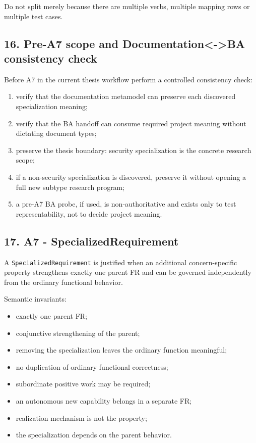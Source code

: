 \documentclass[11pt,a4paper]{article}
\providecommand{\tightlist}{\setlength{\itemsep}{0pt}\setlength{\parskip}{0pt}}
\begin{document}
Do not split merely because there are multiple verbs, multiple mapping
rows or multiple test cases.

\subsection{16. Pre-A7 scope and Documentation\textless-\textgreater BA
consistency
check}\label{16-pre-a7-scope-and-documentation-ba-consistency-check}

Before A7 in the current thesis workflow perform a controlled
consistency check:

\begin{enumerate}
\def\labelenumi{\arabic{enumi}.}
\tightlist
\item
  verify that the documentation metamodel can preserve each discovered
  specialization meaning;
\item
  verify that the BA handoff can consume required project meaning
  without dictating document types;
\item
  preserve the thesis boundary: security specialization is the concrete
  research scope;
\item
  if a non-security specialization is discovered, preserve it without
  opening a full new subtype research program;
\item
  a pre-A7 BA probe, if used, is non-authoritative and exists only to
  test representability, not to decide project meaning.
\end{enumerate}

\subsection{17. A7 -
SpecializedRequirement}\label{17-a7---specializedrequirement}

A \texttt{SpecializedRequirement} is justified when an additional
concern-specific property strengthens exactly one parent FR and can be
governed independently from the ordinary functional behavior.

Semantic invariants:

\begin{itemize}
\tightlist
\item
  exactly one parent FR;
\item
  conjunctive strengthening of the parent;
\item
  removing the specialization leaves the ordinary function meaningful;
\item
  no duplication of ordinary functional correctness;
\item
  subordinate positive work may be required;
\item
  an autonomous new capability belongs in a separate FR;
\item
  realization mechanism is not the property;
\item
  the specialization depends on the parent behavior.
\end{itemize}
\end{document}
